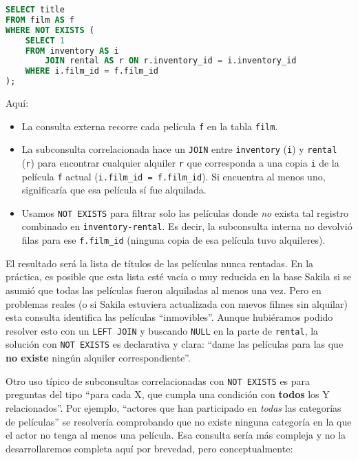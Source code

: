\documentclass[12pt,a4paper]{article}
\begin{document}
\begin{lstlisting}[language=SQL]
SELECT title
FROM film AS f
WHERE NOT EXISTS (
	SELECT 1
	FROM inventory AS i
		JOIN rental AS r ON r.inventory_id = i.inventory_id
	WHERE i.film_id = f.film_id
);
\end{lstlisting}


Aquí:



\begin{itemize}
\item La consulta externa recorre cada película \texttt{f} en la tabla \texttt{film}.
\item La subconsulta correlacionada hace un \texttt{JOIN} entre \texttt{inventory} (\texttt{i}) y \texttt{rental} (\texttt{r}) para encontrar cualquier alquiler \texttt{r} que corresponda a una copia \texttt{i} de la película \texttt{f} actual (\texttt{i.film\_id = f.film\_id}).
%
Si encuentra al menos uno, significaría que esa película sí fue alquilada.
\item Usamos \texttt{NOT EXISTS} para filtrar solo las películas donde \emph{no} exista tal registro combinado en \texttt{inventory-rental}.
%
Es decir, la subconsulta interna no devolvió filas para ese \texttt{f.film\_id} (ninguna copia de esa película tuvo alquileres).
\end{itemize}


 El resultado será la lista de títulos de las películas nunca rentadas.
%
En la práctica, es posible que esta lista esté vacía o muy reducida en la base Sakila si se asumió que todas las películas fueron alquiladas al menos una vez.
%
Pero en problemas reales (o si Sakila estuviera actualizada con nuevos filmes sin alquilar) esta consulta identifica las películas “inmovibles”.
%
Aunque hubiéramos podido resolver esto con un \texttt{LEFT JOIN} y buscando \texttt{NULL} en la parte de \texttt{rental}, la solución con \texttt{NOT EXISTS} es declarativa y clara: “dame las películas para las que \textbf{no existe} ningún alquiler correspondiente”.

Otro uso típico de subconsultas correlacionadas con \texttt{NOT EXISTS} es para preguntas del tipo “para cada X, que cumpla una condición con \textbf{todos} los Y relacionados”.
%
Por ejemplo, “actores que han participado en \textit{todas} las categorías de películas” se resolvería comprobando que no existe ninguna categoría en la que el actor no tenga al menos una película.
%
Esa consulta sería más compleja y no la desarrollaremos completa aquí por brevedad, pero conceptualmente: 
\end{document}
